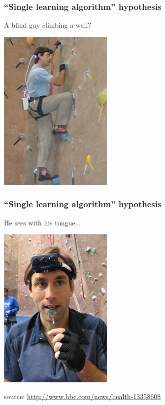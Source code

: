 \begin{frame}
  \frametitle{``Single learning algorithm'' hypothesis}
  \begin{center}
    A blind guy climbing a wall?
  \end{center}
  \begin{center}
    \includegraphics[width=.35\textwidth]{graphics/catarare.jpg}
  \end{center}
\end{frame}

\begin{frame}
  \frametitle{``Single learning algorithm'' hypothesis}
  \begin{center}
    He sees with his tongue...
  \end{center}
  \begin{center}
    \includegraphics[width=.3\textwidth]{graphics/blind.jpg}
  \end{center}
  \begin{center}
    {\tiny source: \url{http://www.bbc.com/news/health-13358608}}
  \end{center}
\end{frame}

